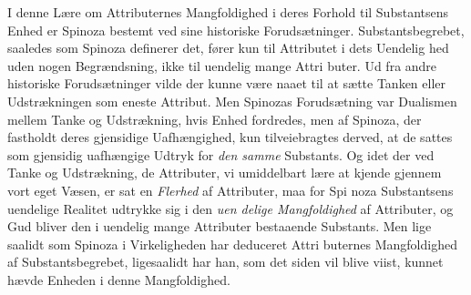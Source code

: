 \documentclass[12pt,a4paper]{book}
\begin{document}
I denne Lære om Attributernes Mangfoldighed i deres
Forhold til Substantsens Enhed er Spinoza bestemt ved sine
historiske Forudsætninger. Substantsbegrebet, saaledes som
Spinoza definerer det, fører kun til Attributet i dets Uendelig\-%
hed uden nogen Begrændsning, ikke til uendelig mange Attri\-%
buter. Ud fra andre historiske Forudsætninger vilde der kunne
være naaet til at sætte Tanken eller Udstrækningen som eneste
Attribut. Men Spinozas Forudsætning var Dualismen mellem
Tanke og Udstrækning, hvis Enhed fordredes, men af Spinoza,
der fastholdt deres gjensidige Uafhængighed, kun tilveiebragtes
derved, at de sattes som gjensidig uafhængige Udtryk for \emph{den
samme} Substants. Og idet der ved Tanke og Udstrækning,
de Attributer, vi umiddelbart lære at kjende gjennem vort
eget Væsen, er sat en \emph{Flerhed} af Attributer, maa for Spi\-%
noza Substantsens uendelige Realitet udtrykke sig i den \emph{uen\-%
delige Mangfoldighed} af Attributer, og Gud bliver den i
uendelig mange Attributer bestaaende Substants. Men lige\-%
saalidt som Spinoza i Virkeligheden har deduceret Attri\-%
buternes Mangfoldighed af Substantsbegrebet, ligesaalidt har
han, som det siden vil blive viist, kunnet hævde Enheden i
denne Mangfoldighed.
\end{document}
